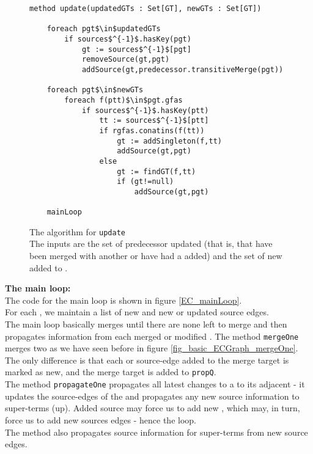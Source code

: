 \begin{figure}
\begin{lstlisting}
method update(updatedGTs : Set[GT], newGTs : Set[GT])
	
	foreach pgt$\in$updatedGTs 
		if sources$^{-1}$.hasKey(pgt)
			gt := sources$^{-1}$[pgt]
			removeSource(gt,pgt)
			addSource(gt,predecessor.transitiveMerge(pgt))
	
	foreach pgt$\in$newGTs
		foreach f(ptt)$\in$pgt.gfas
			if sources$^{-1}$.hasKey(ptt)
				tt := sources$^{-1}$[ptt]
				if rgfas.conatins(f(tt))
					gt := addSingleton(f,tt)
					addSource(gt,pgt)
				else
					gt := findGT(f,tt)
					if (gt!=null)
						addSource(gt,pgt)
				
	mainLoop
\end{lstlisting}
\caption{The algorithm for \lstinline|update|\\
The inputs are the set of predecessor \GTs{} updated (that is, that have been merged with another \GT{} or have had a \GFA{} added)
and the set of new \GTs{} added to .
}
\label{EC_update}
\end{figure}



\bigskip
\noindent
\textbf{The main loop:}\\
The code for the main loop is shown in figure \ref{EC_mainLoop}.\\
For each \GT{}, we maintain a list of new \GFAs{} and new or updated source edges.\\
The main loop basically merges \GTs{} until there are none left to merge and then propagates information from each merged or modified \GT{}.
The method \lstinline|mergeOne| merges two \GTs{} as we have seen before in figure \ref{fig_basic_ECGraph_mergeOne}.
The only difference is that each \GFA{} or source-edge added to the merge target is marked as new, and the merge target is added to \lstinline|propQ|.\\
The method \lstinline|propagateOne| propagates all latest changes to a \GT{} to its adjacent \GTs{} - it updates the source-edges 
of the \GT{} and propagates any new source information to super-terms (up). Added source may force us to add new \GFAs{}, which may, in turn, force us to add new sources edges - hence the loop.\\ 
The method also propagates source information for super-terms from new source edges.


